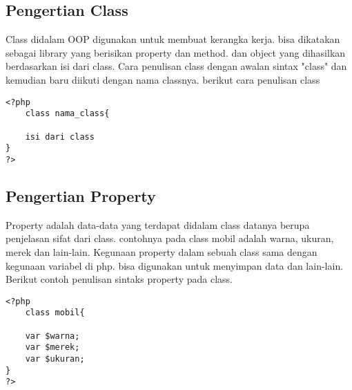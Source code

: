 \subsection{Pengertian Class}
Class didalam OOP digunakan untuk membuat kerangka kerja. bisa dikatakan sebagai library yang berisikan property dan method. dan object yang dihasilkan berdasarkan isi dari class. Cara penulisan class dengan awalan sintax "class" dan kemudian baru diikuti dengan nama classnya. berikut cara penulisan class
 \begin{lstlisting}
<?php
    class nama_class{
	
	isi dari class
}
?>
\end{lstlisting}
\subsection{Pengertian Property}
Property adalah data-data yang terdapat didalam class datanya berupa penjelasan sifat dari class. contohnya pada class mobil adalah warna, ukuran, merek dan lain-lain. Kegunaan property dalam sebuah class sama dengan kegunaan variabel di php. bisa digunakan untuk menyimpan data dan lain-lain. Berikut contoh penulisan sintaks property pada class.
 \begin{lstlisting}
<?php
    class mobil{
	
	var $warna;
	var $merek;
	var $ukuran;
}
?>
\end{lstlisting}